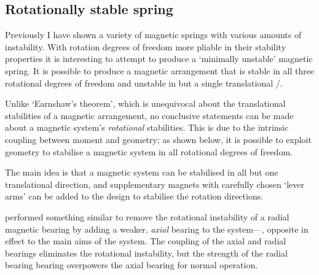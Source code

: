 \documentclass[11pt,a4paper]{memoir}
\begin{document}
\subsection{Rotationally stable spring}

Previously I have shown a variety of magnetic springs with various
amounts of instability. With rotation degrees of freedom more pliable
in their stability properties it is interesting to attempt to produce
a `minimally unstable' magnetic spring. It is possible to produce a
magnetic arrangement that is stable in all three rotational degrees of
freedom and unstable in but a single translational \dof/.

Unlike `Earnshaw's theorem', which is unequivocal about the
translational stabilities of a magnetic arrangement, no conclusive
statements can be made about a magnetic system's \emph{rotational}
stabilities. This is due to the intrinsic coupling between moment and
geometry; as shown below, it is possible to exploit geometry to
stabilise a magnetic system in all rotational degrees of freedom.

The main idea is that a magnetic system can be
stabilised in all but one translational direction, and
supplementary magnets with carefully chosen `lever arms' can be added to the design to stabilise the
rotation directions.

\textcite{delamare1994-ietm} performed something similar to remove the
rotational instability of a radial magnetic bearing by adding a
weaker, \emph{axial} bearing to the system—\ie, opposite in effect
to the main aims of the system. The coupling of the axial and radial
bearings eliminates the rotational instability, but the strength of
the radial bearing bearing overpowers the axial bearing for normal
operation.
\end{document}
